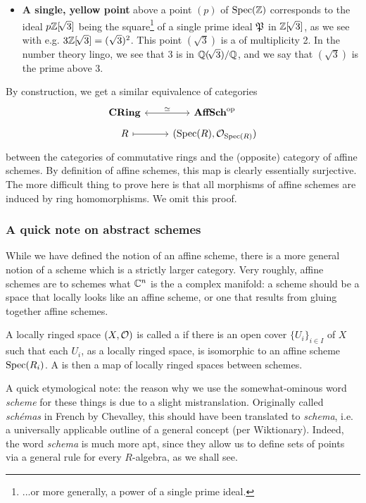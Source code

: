 \begin{eg}
\begin{enumerate}[(i)]
\begin{itemize}
			\item \textbf{A single, yellow point} above a point $(p)$ of $\mathrm{Spec}(\mathbb{Z})$ corresponds to the ideal $p\mathbb{Z}[\!\sqrt{3}]$ being the square\footnote{...or more generally, a power of a single prime ideal.} of a single prime ideal $\mathfrak{P}$ in $\mathbb{Z}[\!\sqrt{3}]$, as we see with e.g. $3\mathbb{Z}[\!\sqrt{3}] = (\sqrt{3})^2$. This point $(\sqrt{3})$ is a  of multiplicity 2. In the number theory lingo, we see that $3$ is  in $\mathbb{Q}(\!\sqrt{3})/\mathbb{Q}$, and we say that $(\sqrt{3})$ is the prime above $3$.
		\end{itemize}
	\end{enumerate}
\end{eg}

By construction, we get a similar equivalence of categories
\[
	\begin{tikzcd}[row sep=tiny]
		\mathbf{CRing} \rar[leftrightarrow, "\simeq"] & \mathbf{AffSch}^\text{op}\\
		R \rar[mapsto] & (\Spec(R), \ints_{\Spec(R)})
	\end{tikzcd}
\]
between the categories of commutative rings and the (opposite) category of affine schemes. By definition of affine schemes, this map is clearly essentially surjective. The more difficult thing to prove here is that all morphisms of affine schemes are induced by ring homomorphisms. We omit this proof.




\subsubsection{A quick note on abstract schemes}
\label{subsubsec:2_2_1_general_schemes}
While we have defined the notion of an affine scheme, there is a more general notion of a scheme which is a strictly larger category. Very roughly, affine schemes are to schemes what $\mathbb{C}^n$ is the a complex manifold: a scheme should be a space that locally looks like an affine scheme, or one that results from gluing together affine schemes.

\begin{defn}
	A locally ringed space $(X, \mathcal{O})$ is called a  if there is an open cover $\{U_i\}_{i \in I}$ of $X$ such that each $U_i$, as a locally ringed space, is isomorphic to an affine scheme $\mathrm{Spec}(R_i)$. A  is then a map of locally ringed spaces between schemes.
\end{defn}

\begin{rmk}
	A quick etymological note: the reason why we use the somewhat-ominous word \emph{scheme} for these things is due to a slight mistranslation. Originally called \emph{sch\'emas} in French by Chevalley, this should have been translated to \emph{schema}, i.e. a universally applicable outline of a general concept (per Wiktionary). Indeed, the word \emph{schema} is much more apt, since they allow us to define sets of points via a general rule for every $R$-algebra, as we shall see.
\end{rmk}

